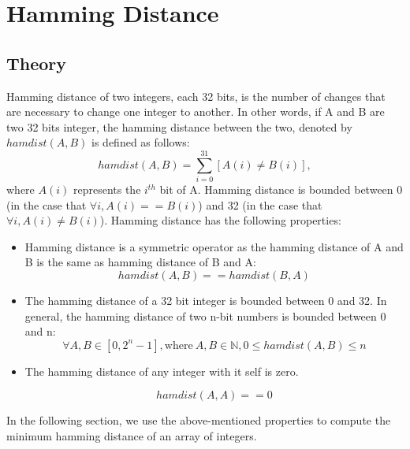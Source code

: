 \section{Hamming Distance}
\subsection{Theory}
Hamming distance of two integers, each 32 bits, is the number of changes that are necessary to change one integer to another. In other words, if A and B are two 32 bits integer, the hamming distance between the two, denoted by $hamdist(A,B)$ is defined as follows:
\begin{equation}\label{hammingdist}
		hamdist(A,B) = \sum_{i=0}^{31}\left[A(i) \neq B(i)\right],
\end{equation}
where $A(i)$ represents the $i^{th}$ bit of A. Hamming distance is bounded between 0 (in the case that $\forall i, A(i)==B(i)$) and 32 (in the case that $\forall i, A(i)\neq B(i)$). Hamming distance has the following properties:
\begin{itemize}

\item{}
Hamming distance is a symmetric operator as the hamming distance of A and B is the same as hamming distance of B and A:
\begin{equation}\label{symmetry}
		hamdist(A, B) == hamdist(B,A)
\end{equation}

\item{}
The hamming distance of a 32 bit integer is bounded between 0 and 32. In general, the hamming distance of two n-bit numbers is bounded between 0 and n:
\begin{equation}\label{bounded}
	\forall A,B \in \left[0, 2^n-1 \right], \mbox{where}\ A, B \in \mathbb{N}, 0 \leq hamdist(A, B) \leq n
\end{equation}

\item{}
The hamming distance of any integer with it self is zero.  

\begin{equation}\label{ZReflect}
		hamdist(A, A) == 0
\end{equation}
\end{itemize}

In the following section, we use the above-mentioned properties to compute the minimum hamming distance of an array of integers.

